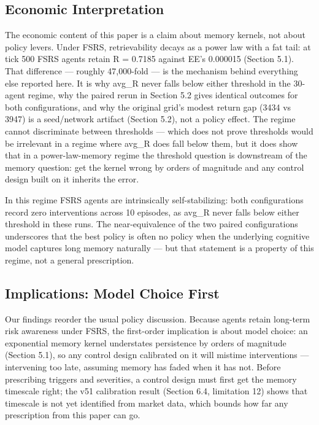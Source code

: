 \documentclass[11pt]{article}
\begin{document}
\subsection{Economic Interpretation}
The economic content of this paper is a claim about memory kernels, not about policy levers. Under FSRS, retrievability decays as a power law with a fat tail: at tick 500 FSRS agents retain R = 0.7185 against EE's 0.000015 (Section 5.1). That difference --- roughly 47,000-fold --- is the mechanism behind everything else reported here. It is why avg\_R never falls below either threshold in the 30-agent regime, why the paired rerun in Section 5.2 gives identical outcomes for both configurations, and why the original grid's modest return gap (3434 vs 3947) is a seed/network artifact (Section 5.2), not a policy effect. The regime cannot discriminate between thresholds --- which does not prove thresholds would be irrelevant in a regime where avg\_R does fall below them, but it does show that in a power-law-memory regime the threshold question is downstream of the memory question: get the kernel wrong by orders of magnitude and any control design built on it inherits the error.

In this regime FSRS agents are intrinsically self-stabilizing: both configurations record zero interventions across 10 episodes, as avg\_R never falls below either threshold in these runs. The near-equivalence of the two paired configurations underscores that the best policy is often no policy when the underlying cognitive model captures long memory naturally --- but that statement is a property of this regime, not a general prescription.

\subsection{Implications: Model Choice First}
Our findings reorder the usual policy discussion. Because agents retain long-term risk awareness under FSRS, the first-order implication is about model choice: an exponential memory kernel understates persistence by orders of magnitude (Section 5.1), so any control design calibrated on it will mistime interventions --- intervening too late, assuming memory has faded when it has not. Before prescribing triggers and severities, a control design must first get the memory timescale right; the v51 calibration result (Section 6.4, limitation 12) shows that timescale is not yet identified from market data, which bounds how far any prescription from this paper can go.
\end{document}
